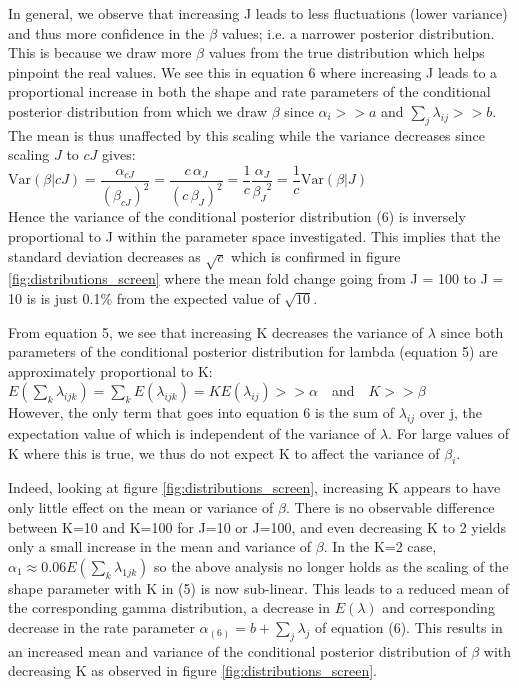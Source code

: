 \documentclass{article}
\begin{document}
In general, we observe that increasing J leads to less fluctuations (lower variance) and thus more confidence in the $\beta$ values; i.e. a narrower posterior distribution. This is because we draw more $\beta$ values from the true distribution which helps pinpoint the real values. We see this in equation 6 where increasing J leads to a proportional increase in both the shape and rate parameters of the conditional posterior distribution from which we draw $\beta$ since $\alpha_i >> a$ and $\sum_j{\lambda_{ij}} >> b$. The mean is thus unaffected by this scaling while the variance decreases since scaling $J$ to $c J$ gives:\\
$\text{Var}(\beta | cJ) =\dfrac{\alpha_{cJ}}{{(\beta_{cJ})}^2} = \dfrac{c\, \alpha_J}{{(c\, \beta_J )}^2} = \dfrac{1}{c} \dfrac{\alpha_J}{{\beta_J}^2} = \dfrac{1}{c}\text{Var}(\beta | J)$ \\
Hence the variance of the conditional posterior distribution (6) is inversely proportional to J within the parameter space investigated. This implies that the standard deviation decreases as $\sqrt{c}$ which is confirmed in figure \ref{fig:distributions_screen} where the mean fold change going from J = 100 to J = 10 is is just 0.1\% from the expected value of $\sqrt{10}$.

From equation 5, we see that increasing K decreases the variance of $\lambda$ since both parameters of the conditional posterior distribution for lambda (equation 5) are approximately proportional to K:\\
$E(\sum_k{\lambda_{ijk}}) = \sum_k{E(\lambda_{ijk})} = K E(\lambda_{ij}) >> \alpha ~~~$     and      $~~~K >> \beta$\\
However, the only term that goes into equation 6 is the sum of $\lambda_{ij}$ over j, the expectation value of which is independent of the variance of $\lambda$. For large values of K where this is true, we thus do not expect K to affect the variance of $\beta_i$.

Indeed, looking at figure \ref{fig:distributions_screen}, increasing K appears to have only little effect on the mean or variance of $\beta$. There is no observable difference between K=10 and K=100 for J=10 or J=100, and even decreasing K to 2 yields only a small increase in the mean and variance of $\beta$. In the K=2 case, $\alpha_1 \approx 0.06 E(\sum_k{\lambda_{1jk}}) $ so the above analysis no longer holds as the scaling of the shape parameter with K in (5) is now sub-linear. This leads to a reduced mean of the corresponding gamma distribution, a decrease in $E(\lambda)$ and corresponding decrease in the rate parameter $\alpha_{(6)} = b + \sum_j{\lambda_j}$ of equation (6). This results in an increased mean and variance of the conditional posterior distribution of $\beta$ with decreasing K as observed in figure \ref{fig:distributions_screen}.
\end{document}
